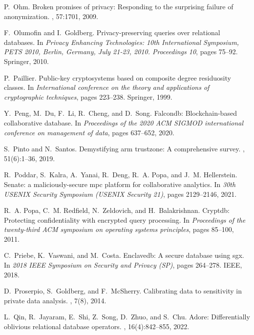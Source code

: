\documentclass[11pt]{article}
\begin{document}
\begin{thebibliography}{140}
\begin{small}
P.~Ohm.
\newblock Broken promises of privacy: Responding to the surprising failure of
  anonymization.
, 57:1701, 2009.

F.~Olumofin and I.~Goldberg.
\newblock Privacy-preserving queries over relational databases.
\newblock In {\em Privacy Enhancing Technologies: 10th International Symposium,
  PETS 2010, Berlin, Germany, July 21-23, 2010. Proceedings 10}, pages 75--92.
  Springer, 2010.

P.~Paillier.
\newblock Public-key cryptosystems based on composite degree residuosity
  classes.
\newblock In {\em International conference on the theory and applications of
  cryptographic techniques}, pages 223--238. Springer, 1999.

Y.~Peng, M.~Du, F.~Li, R.~Cheng, and D.~Song.
\newblock Falcondb: Blockchain-based collaborative database.
\newblock In {\em Proceedings of the 2020 ACM SIGMOD international conference
  on management of data}, pages 637--652, 2020.

S.~Pinto and N.~Santos.
\newblock Demystifying arm trustzone: A comprehensive survey.
, 51(6):1--36, 2019.

R.~Poddar, S.~Kalra, A.~Yanai, R.~Deng, R.~A. Popa, and J.~M. Hellerstein.
\newblock Senate: a maliciously-secure mpc platform for collaborative
  analytics.
\newblock In {\em 30th USENIX Security Symposium (USENIX Security 21)}, pages
  2129--2146, 2021.

R.~A. Popa, C.~M. Redfield, N.~Zeldovich, and H.~Balakrishnan.
\newblock Cryptdb: Protecting confidentiality with encrypted query processing.
\newblock In {\em Proceedings of the twenty-third ACM symposium on operating
  systems principles}, pages 85--100, 2011.

C.~Priebe, K.~Vaswani, and M.~Costa.
\newblock Enclavedb: A secure database using sgx.
\newblock In {\em 2018 IEEE Symposium on Security and Privacy (SP)}, pages
  264--278. IEEE, 2018.

D.~Proserpio, S.~Goldberg, and F.~McSherry.
\newblock Calibrating data to sensitivity in private data analysis.
, 7(8), 2014.

L.~Qin, R.~Jayaram, E.~Shi, Z.~Song, D.~Zhuo, and S.~Chu.
\newblock Adore: Differentially oblivious relational database operators.
, 16(4):842--855, 2022.


\end{small}
\end{thebibliography}
\end{document}
